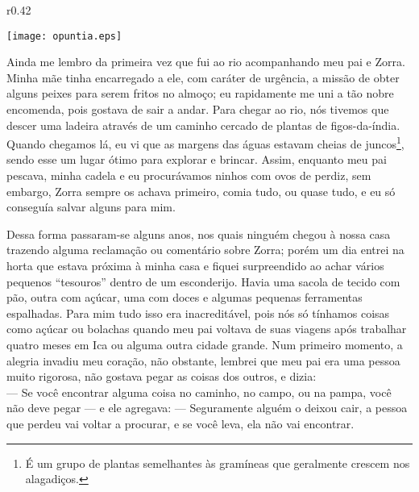 \ifdefined\EnableIncludeImages
\begin{wrapfigure}{r}{0.42\textwidth}
  \begin{center}
  \vspace{-30pt}
    \texttt{[image: opuntia.eps]}
  \end{center}
  \vspace{-20pt}
\end{wrapfigure}
\fi
Ainda me lembro da primeira vez que fui ao rio acompanhando meu pai e Zorra. Minha mãe tinha encarregado a ele, com caráter de urgência, a missão de obter alguns peixes para serem fritos no almoço; eu rapidamente me uni a tão nobre encomenda, pois gostava de sair a andar. 
Para chegar ao rio, nós tivemos que descer uma ladeira através de um caminho cercado de plantas de figos-da-índia. Quando chegamos lá, eu vi que as margens das águas estavam cheias de juncos\footnote{É um grupo de plantas semelhantes às gramíneas que geralmente crescem nos alagadiços.}, sendo esse um lugar ótimo para explorar e brincar. Assim, enquanto meu pai pescava, minha cadela e eu procurávamos ninhos com ovos de perdiz, sem embargo, Zorra sempre os achava primeiro, comia tudo, ou quase tudo, e eu só conseguía salvar alguns para mim.


Dessa forma passaram-se alguns anos, nos quais ninguém chegou à nossa casa trazendo alguma reclamação ou comentário sobre Zorra; porém um dia entrei na horta que estava próxima à minha casa e fiquei surpreendido ao achar vários pequenos ``tesouros'' dentro de um esconderijo. Havia uma sacola de tecido com pão, outra com açúcar, uma com doces e algumas pequenas ferramentas espalhadas. 
Para mim tudo isso era inacreditável, pois nós só tínhamos coisas como açúcar ou bolachas quando meu pai voltava de suas viagens após trabalhar quatro meses em Ica ou alguma outra cidade grande.
Num primeiro momento, a alegria invadiu meu coração, não obstante, lembrei que meu pai era uma pessoa muito rigorosa, não gostava pegar as coisas dos outros, e dizia:\\\indent
--- Se você encontrar alguma coisa no caminho, no campo, ou na pampa, você não deve pegar ---
e ele agregava:
--- Seguramente alguém o deixou cair, a pessoa que perdeu vai voltar a procurar, e se você leva, ela não vai encontrar.\\ 

